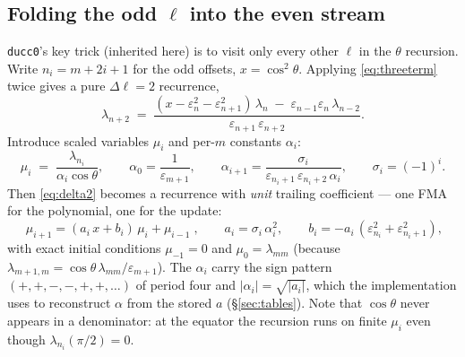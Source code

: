 \documentclass[11pt]{article}
\newcommand{\eps}{\varepsilon}
\newcommand{\cth}{\cos\theta}
\begin{document}
\subsection{Folding the odd $\ell$ into the even stream}
\label{sec:fold-l}

\texttt{ducc0}'s key trick (inherited here) is to visit only every other
$\ell$ in the $\theta$ recursion.  Write $n_{i} = m + 2i + 1$ for the odd
offsets, $x = \cos^2\theta$.  Applying \eqref{eq:threeterm} twice gives a
pure $\Delta\ell = 2$ recurrence,
\begin{equation}
\lambda_{n+2} \;=\;
\frac{(x - \eps_n^2 - \eps_{n+1}^2)\,\lambda_{n}
      \;-\; \eps_{n-1}\eps_{n}\,\lambda_{n-2}}{\eps_{n+1}\,\eps_{n+2}} .
\label{eq:delta2}
\end{equation}
Introduce scaled variables $\mu_i$ and per-$m$ constants $\alpha_i$:
\begin{equation}
\mu_i \;=\; \frac{\lambda_{n_i}}{\alpha_i \cth},
\qquad
\alpha_0 = \frac{1}{\eps_{m+1}},\qquad
\alpha_{i+1} = \frac{\sigma_i}{\eps_{n_i+1}\,\eps_{n_i+2}\,\alpha_i},
\qquad \sigma_i = (-1)^{i} .
\label{eq:alpha}
\end{equation}
Then \eqref{eq:delta2} becomes a recurrence with \emph{unit} trailing
coefficient --- one FMA for the polynomial, one for the update:
\begin{equation}
\boxed{\;\mu_{i+1} = (a_i\,x + b_i)\,\mu_i + \mu_{i-1}\;},
\qquad
a_i = \sigma_i\,\alpha_i^2,\qquad
b_i = -a_i\,(\eps_{n_i}^2 + \eps_{n_i+1}^2),
\label{eq:murec}
\end{equation}
with exact initial conditions $\mu_{-1} = 0$ and
$\mu_0 = \lambda_{mm}$ (because $\lambda_{m+1,m} = \cth\,\lambda_{mm}/
\eps_{m+1}$).  The $\alpha_i$ carry the sign pattern
$(+,+,-,-,+,+,\dots)$ of period four and $|\alpha_i| = \sqrt{|a_i|}$, which
the implementation uses to reconstruct $\alpha$ from the stored $a$
(\S\ref{sec:tables}).  Note that $\cth$ never appears in a denominator: at
the equator the recursion runs on finite $\mu_i$ even though
$\lambda_{n_i}(\pi/2) = 0$.
\end{document}
